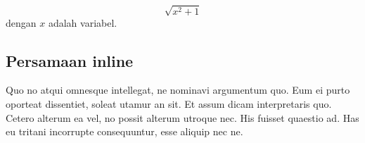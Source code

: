 \begin{equation}
\sqrt{x^2+1}
\end{equation}
    dengan $x$ adalah variabel.


\subsection{Persamaan inline}
Quo no atqui omnesque intellegat, ne nominavi argumentum quo. Eum ei purto oporteat dissentiet, soleat utamur an sit. Et assum dicam interpretaris quo. Cetero alterum ea vel, no possit alterum utroque nec. His fuisset quaestio ad. Has eu tritani incorrupte consequuntur, esse aliquip nec ne.
